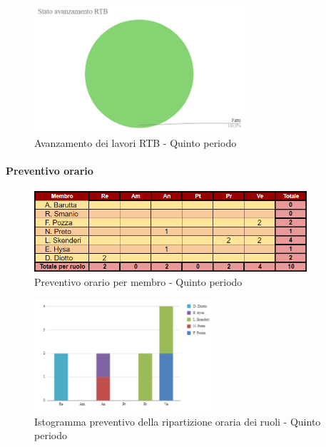 \pagebreak

\begin{figure}[H]
    \centering
    \begin{minipage}[b]{0.70\textwidth}
        \centering
        \includegraphics[width=0.7\textwidth]{../Images/avanzamento5Periodo.png}
        \caption{Avanzamento dei lavori RTB - Quinto periodo}
        \label{fig:Avanzamento_RTB_5}
    \end{minipage}
\end{figure}

\paragraph{Preventivo orario}

\begin{figure}[H]
    \centering
    \includegraphics[width=0.9\textwidth]{../Images/preventivoOrario5Periodo.png}
    \caption{Preventivo orario per membro - Quinto periodo}
    \label{fig:Preventivo_orario_5}
\end{figure}

\vspace{0.6cm}

\begin{figure}[H] 
    \centering
    \includegraphics[width=0.6\textwidth]{../Images/preventivoDivisioneRuoli5Periodo.png}
    \caption{Istogramma preventivo della ripartizione oraria dei ruoli - Quinto periodo}
    \label{fig:Preventivo_ripartizione_oraria_5}
\end{figure} 

